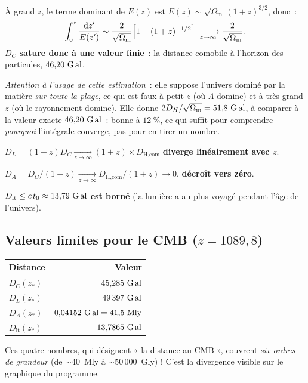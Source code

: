\documentclass[11pt,a4paper,openany]{report}
\newcommand{\dif}{\mathrm{d}}
\newcommand{\Gly}{\text{G\,al}}
\newcommand{\Om}{\Omega_{\mathrm{m}}}
\begin{document}
\begin{tcolorbox}[mathspe]
À grand $z$, le terme dominant de $E(z)$ est $E(z) \sim \sqrt{\Om}\,(1+z)^{3/2}$,
donc~:
\[
\int_{0}^{z}\frac{\dif z'}{E(z')} \sim \frac{2}{\sqrt{\Om}}\Bigl[1 - (1+z)^{-1/2}\Bigr]
\xrightarrow[z\to\infty]{} \frac{2}{\sqrt{\Om}}.
\]
\textbf{$D_{C}$ sature donc à une valeur finie}~: la distance comobile à
l'horizon des particules, $46{,}20~\Gly$.

\medskip
\emph{Attention à l'usage de cette estimation}~: elle suppose l'univers dominé
par la matière \emph{sur toute la plage}, ce qui est faux à petit $z$ (où
$\Lambda$ domine) et à très grand $z$ (où le rayonnement domine). Elle donne
$2D_{H}/\sqrt{\Om} = 51{,}8~\Gly$, à comparer à la valeur exacte
$46{,}20~\Gly$~: bonne à $12~\%$, ce qui suffit pour comprendre \emph{pourquoi}
l'intégrale converge, pas pour en tirer un nombre.

\medskip
$D_{L} = (1+z) D_{C} \xrightarrow[z\to\infty]{} (1+z) \times D_{\text{H,com}}$
\textbf{diverge linéairement avec $z$}.

\medskip
$D_{A} = D_{C}/(1+z) \xrightarrow[z\to\infty]{} D_{\text{H,com}}/(1+z) \to 0$,
\textbf{décroît vers zéro}.

\medskip
$D_{\text{lt}} \le c\,t_{0} \approx 13{,}79~\Gly$ \textbf{est borné} (la lumière a
au plus voyagé pendant l'âge de l'univers).
\end{tcolorbox}

\subsection{Valeurs limites pour le CMB ($z = 1089{,}8$)}

\begin{center}
\renewcommand{\arraystretch}{1.3}
\begin{tabular}{lr}
\toprule
\textbf{Distance} & \textbf{Valeur} \\
\midrule
$D_{C}(z_{*})$        & $45{,}285~\Gly$ \\
$D_{L}(z_{*})$        & $49\,397~\Gly$ \\
$D_{A}(z_{*})$        & $0{,}04152~\Gly = 41{,}5~\text{Mly}$ \\
$D_{\text{lt}}(z_{*})$ & $13{,}7865~\Gly$ \\
\bottomrule
\end{tabular}
\end{center}

\noindent Ces quatre nombres, qui désignent « la distance au CMB », couvrent
\emph{six ordres de grandeur} (de $\sim 40$~Mly à $\sim 50\,000$~Gly) !
C'est la divergence visible sur le graphique du programme.
\end{document}
